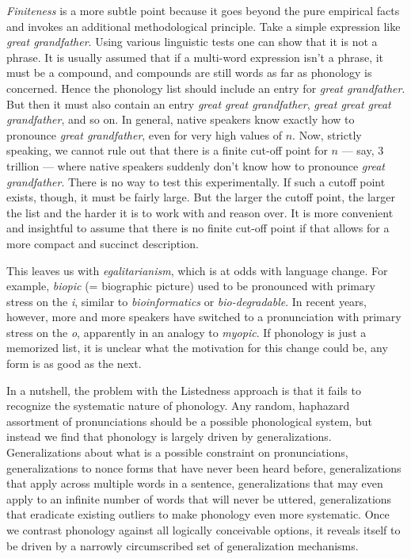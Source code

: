 \emph{Finiteness} is a more subtle point because it goes beyond the pure empirical facts and invokes an additional methodological principle.
Take a simple expression like \emph{great grandfather}.
Using various linguistic tests one can show that it is not a phrase.
It is usually assumed that if a multi-word expression isn't a phrase, it must be a compound, and compounds are still words as far as phonology is concerned.
Hence the phonology list should include an entry for \emph{great grandfather}.
But then it must also contain an entry \emph{great great grandfather}, \emph{great great great grandfather}, and so on.
In general, native speakers know exactly how to pronounce \emph{great grandfather}, even for very high values of $n$.
Now, strictly speaking, we cannot rule out that there is a finite cut-off point for $n$ --- say, 3 trillion --- where native speakers suddenly don't know how to pronounce \emph{great grandfather}.
There is no way to test this experimentally.
If such a cutoff point exists, though, it must be fairly large.
But the larger the cutoff point, the larger the list and the harder it is to work with and reason over.
It is more convenient and insightful to assume that there is no finite cut-off point if that allows for a more compact and succinct description.

This leaves us with \emph{egalitarianism}, which is at odds with language change.
For example, \emph{biopic} (= biographic picture) used to be pronounced with primary stress on the \emph{i}, similar to \emph{bioinformatics} or \emph{bio-degradable}.
In recent years, however, more and more speakers have switched to a pronunciation with primary stress on the \emph{o}, apparently in an analogy to \emph{myopic}.
If phonology is just a memorized list, it is unclear what the motivation for this change could be, any form is as good as the next.

In a nutshell, the problem with the Listedness approach is that it fails to recognize the systematic nature of phonology.
Any random, haphazard assortment of pronunciations should be a possible phonological system, but instead we find that phonology is largely driven by generalizations.
Generalizations about what is a possible constraint on pronunciations,
generalizations to nonce forms that have never been heard before,
generalizations that apply across multiple words in a sentence,
generalizations that may even apply to an infinite number of words that will never be uttered,
generalizations that eradicate existing outliers to make phonology even more systematic.
Once we contrast phonology against all logically conceivable options, it reveals itself to be driven by a narrowly circumscribed set of generalization mechanisms.


